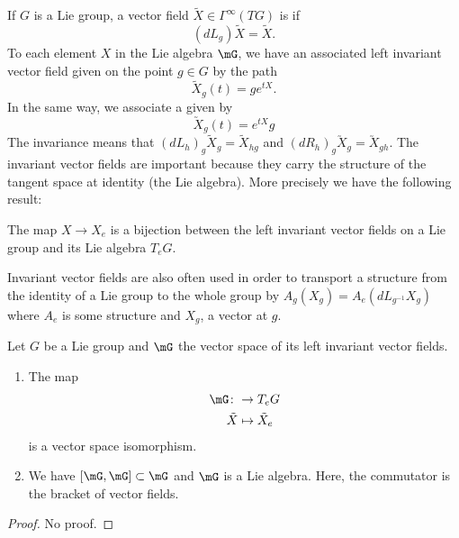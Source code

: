 If $G$ is a Lie group, a vector field $\tilde X\in\Gamma^{\infty}(TG)$ is  if 
\begin{equation}
	(dL_g)\tilde X=\tilde X.
\end{equation}
To each element $X$ in the Lie algebra $\mG$, we have an associated left invariant vector field given on the point $g\in G$ by the path
\begin{equation}
	\tilde X_g(t)=ge^{tX}.
\end{equation}
In the same way, we associate a  given by
\begin{equation}
	\utilde X_g(t)=e^{tX}g
\end{equation}
The invariance means that $(dL_h)_g\tilde X_g=\tilde X_{hg}$ and $(dR_h)_g\utilde X_g=\utilde X_{gh}$. The invariant vector fields are important because they carry the structure of the tangent space at identity (the Lie algebra). More precisely we have the following result:

\begin{theorem}
	The map $X\to X_e$ is a bijection between the left invariant vector fields on a Lie group and its Lie algebra $T_eG$.
\end{theorem}
Invariant vector fields are also often used in order to transport a structure from the identity of a Lie group to the whole group by $A_g(X_g)=A_e(dL_{g^{-1}}X_g)$ where $A_e$ is some structure and $X_g$, a vector at $g$.


\begin{proposition}
	Let $G$ be a Lie group and $\mG$ the vector space of its left invariant vector fields.
	\begin{enumerate}

		\item
			The map
			\begin{equation}
				\begin{aligned}
					\mG\colon &\to T_eG \\
					\tilde X&\mapsto \tilde X_e 
				\end{aligned}
			\end{equation}
			is a vector space isomorphism.
		\item
			We have $[\mG,\mG]\subset \mG$ and $\mG$ is a Lie algebra. Here, the commutator is the bracket of vector fields.

	\end{enumerate}
\end{proposition}
\begin{proof}
	No proof.
\end{proof}

